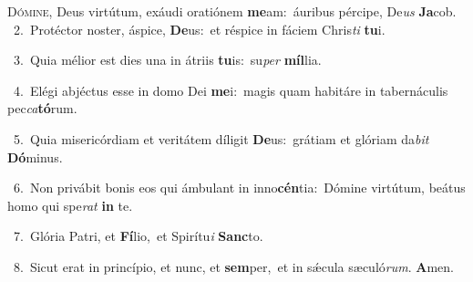 \lettrine{\initial\textcolor{\initialcolor}{D}}{ómine,} Deus virtútum, exáudi oratiónem \textbf{me}\-am:~\star áuribus pércipe, De\textit{us} \textbf{Ja}\-cob.\\
{\numbfont\textcolor{\numbcolor}{~2.}}~Protéctor noster, áspice, \textbf{De}\-us:~\star et réspice in fáciem Chris\textit{ti} \textbf{tu}\-i.\par
{\numbfont\textcolor{\numbcolor}{~3.}}~Quia mélior est dies una in átriis \textbf{tu}\-is:~\star su\textit{per} \textbf{míl}\-lia.\par
{\numbfont\textcolor{\numbcolor}{~4.}}~Elégi abjéctus esse in domo Dei \textbf{me}\-i:~\star magis quam habitáre in tabernáculis pec\-\textit{ca}\-\textbf{tó}rum.\par
{\numbfont\textcolor{\numbcolor}{~5.}}~Quia misericórdiam et veritátem díligit \textbf{De}\-us:~\star grátiam et glóriam da\textit{bit} \textbf{Dó}\-minus.\par
{\numbfont\textcolor{\numbcolor}{~6.}}~Non privábit bonis eos qui ámbulant in inno\-\textbf{cén}\-tia:~\star Dómine virtútum, beátus homo qui spe\textit{rat} \textbf{in} te.\par
{\numbfont\textcolor{\numbcolor}{~7.}}~Glória Patri, et \textbf{Fí}\-lio,~\star et Spirítu\textit{i} \textbf{Sanc}\-to.\par
{\numbfont\textcolor{\numbcolor}{~8.}}~Sicut erat in princípio, et nunc, et \textbf{sem}\-per,~\star et in sǽcula sæculó\-\textit{rum}\-. \textbf{A}\-men.\par
